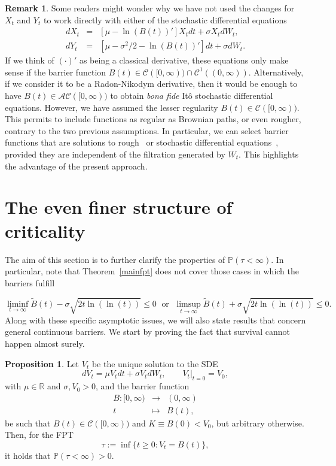\documentclass[12pt]{article}
\theoremstyle{definition}
\newtheorem{remark}{Remark}[theorem]
\newtheorem{proposition}{Proposition}[theorem]
\begin{document}
\begin{remark}
Some readers might wonder why we have not used the changes for $X_t$ and $Y_t$ to work directly with either of the stochastic differential equations
\begin{eqnarray} \nonumber
dX_t &=& [\mu - \ln(B(t))'] X_t dt + \sigma X_t dW_t, \\ \nonumber
dY_t &=& [\mu -\sigma^2/2 - \ln(B(t))'] dt + \sigma dW_t.
\end{eqnarray}
If we think of $(\cdot)'$ as being a classical derivative, these equations
only make sense if the barrier function $B(t) \in \mathcal{C}([0,\infty)) \cap \mathcal{C}^1((0,\infty))$. Alternatively, if we consider it to be a Radon-Nikodym derivative, then it would be enough to have $B(t) \in \mathcal{AC}([0,\infty))$ to obtain {\it bona fide} It\^o stochastic differential equations. However, we have assumed the lesser regularity $B(t) \in \mathcal{C}([0,\infty))$. This permits to include functions  as regular as Brownian paths, or even rougher, contrary to the two previous assumptions. In particular, we can select barrier functions that are solutions to rough~\cite{lyons1998differential} or stochastic differential equations~\cite{oksendal2013}, provided they are independent of the filtration generated by $W_t$. This highlights the advantage of the present approach.
\end{remark}

\section{The even finer structure of criticality}\label{sec:critical_prob}

The aim of this section is to further clarify the properties of $\mathbb{P}(\tau<\infty)$. In particular, note that Theorem~\ref{mainfpt} does not cover those cases in which the barriers fulfill

$$
\liminf_{t \to \infty}\tilde{B}(t)- \sigma \sqrt{2t \ln(\ln(t))} \le 0\;\text{ or }\;
\limsup_{t \to \infty} \tilde{B}(t)+\sigma \sqrt{2t \ln(\ln(t))} \le 0.
$$
Along with these specific asymptotic issues, we will also state results that concern general continuous barriers. We start by proving the fact that survival cannot happen almost surely.

\begin{proposition}\label{prop:tlti}
Let $V_t$ be the unique solution to the SDE
$$
dV_t=\mu V_t dt + \sigma V_t dW_t, \qquad \left. V_t \right|_{t=0}= V_0,
$$
with $\mu \in \mathbb{R}$ and $\sigma, V_0>0$, and the barrier function
\begin{eqnarray}\nonumber
B:[0,\infty) &\longrightarrow& (0,\infty) \\ \nonumber
t &\longmapsto& B(t),
\end{eqnarray}
be such that $B(t) \in \mathcal{C}([0,\infty))$ and $K \equiv B(0)<V_0$, but arbitrary otherwise. Then, for the FPT
$$
\tau := \inf \{t \ge 0 : V_t = B(t)\},
$$
it holds that $\mathbb{P}(\tau < \infty) >0$.
\end{proposition}
\end{document}
